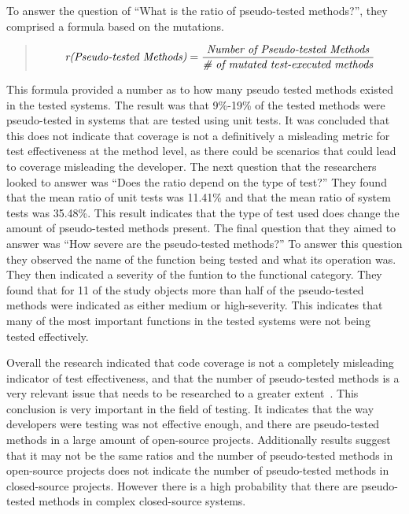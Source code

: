 To answer the question of ``What is the ratio of pseudo-tested methods?'', they comprised a formula based on the mutations.

\begin{quote}
\begin{equation}
 \mbox{\emph{r(Pseudo-tested Methods)}}= \frac{\mbox{\emph{Number of Pseudo-tested Methods}}}{\mbox{\emph{\# of mutated test-executed methods}}}
\end{equation}
\end{quote}

This formula provided a number as to how many pseudo tested methods existed in the tested systems. The result was that 9\%-19\% of the tested methods were pseudo-tested in systems that are tested using unit tests. It was concluded that this does not indicate that coverage is not a definitively a misleading metric for test effectiveness at the method level, as there could be scenarios that could lead to coverage misleading the developer. The next question that the researchers looked to answer was ``Does the ratio depend on the type of test?'' They found that the mean ratio of unit tests was 11.41\% and that the mean ratio of system tests was 35.48\%. This result indicates that the type of test used does change the amount of pseudo-tested methods present. The final question that they aimed to answer was ``How severe are the pseudo-tested methods?'' To answer this question they observed the name of the function being tested and what its operation was. They then indicated a severity of the funtion to the functional category. They found that for 11 of the study objects more than half of the pseudo-tested methods were indicated as either medium or high-severity. This indicates that many of the most important functions in the tested systems were not being tested effectively.

Overall the research indicated that code coverage is not a completely misleading indicator of test effectiveness, and that the number of pseudo-tested methods is a very relevant issue that needs to be researched to a greater extent~\cite{niedermayr2016will}. This conclusion is very important in the field of testing. It indicates that the way developers were testing was not effective enough, and there are pseudo-tested methods in a large amount of open-source projects. Additionally results suggest that it may not be the same ratios and the number of pseudo-tested methods in open-source projects does not indicate the number of pseudo-tested methods in closed-source projects. However there is a high probability that there are pseudo-tested methods in complex closed-source systems.

